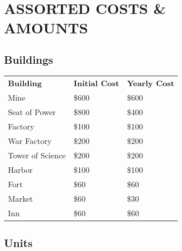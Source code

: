 
\chapter[Assorted Costs \& Amounts]{{\Huge A}SSORTED {\Huge C}OSTS {\Huge \&} {\Huge A}MOUNTS}


\section{Buildings}

\begin{tabular}{|p{1.3in} p{1.3in} p{1.3in}|}
    \hline
    \textbf{Building} & \textbf{Initial Cost} & \textbf{Yearly Cost} \\ 
    \rowcolor{gray}Mine & \$600 & \$600 \\ 
    Seat of Power & \$800 & \$400 \\ 
    \rowcolor{gray}Factory    & \$100 & \$100 \\ 
    War Factory    & \$200 & \$200 \\ 
    \rowcolor{gray}Tower of Science & \$200 & \$200 \\ 
    Harbor & \$100 &\$100 \\ 
    \rowcolor{gray}Fort & \$60 & \$60 \\ 
    Market & \$60 & \$30 \\ 
    \rowcolor{gray}Inn    & \$60 & \$60 \\ 
    \hline
\end{tabular}    

\clearpage

\section{Units}

